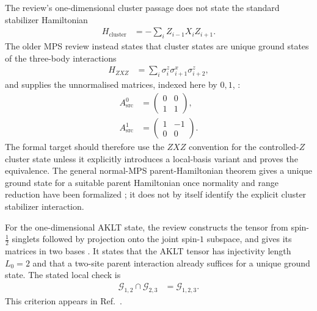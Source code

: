 \documentclass{article}
\begin{document}
The review's one-dimensional cluster passage does not state the standard
stabilizer Hamiltonian
\begin{align}
    H_{\mathrm{cluster}}
        &=
        -\sum_i Z_{i-1}X_iZ_{i+1}.
    \label{eq:rmp_example_parent_hamiltonian_scope_cluster_stabilizer}
\end{align}
The older MPS review instead states that cluster states are unique ground states
of the three-body interactions
\begin{align}
    H_{ZXZ}
        &=
        \sum_i
        \sigma_i^z
        \sigma_{i+1}^x
        \sigma_{i+2}^z,
    \label{eq:rmp_example_parent_hamiltonian_scope_cluster_three_body}
\end{align}
and supplies the unnormalised matrices, indexed here by $0,1$,
\cite[local TeX lines~374--387]{PerezGarcia2007MPSReps}:
\begin{align}
    A_{\mathrm{src}}^0 &= \begin{pmatrix}0&0\\1&1\end{pmatrix},
    \label{eq:rmp_example_parent_hamiltonian_scope_source_zero}\\
    A_{\mathrm{src}}^1 &= \begin{pmatrix}1&-1\\0&0\end{pmatrix}.
    \label{eq:rmp_example_parent_hamiltonian_scope_source_one}
\end{align}
The formal target
should therefore use the $ZXZ$ convention for the controlled-$Z$ cluster state
unless it explicitly introduces a local-basis variant and proves the
equivalence. The general normal-MPS parent-Hamiltonian theorem gives a unique
ground state for a suitable parent Hamiltonian once normality and range
reduction have been formalized
\cite[lines~2087--2090]{Cirac2021Matrix}; it does not by itself identify the
explicit cluster stabilizer interaction.

For the one-dimensional AKLT state, the review constructs the tensor from
spin-$\tfrac12$ singlets followed by projection onto the joint spin-$1$
subspace, and gives its matrices in two bases
\cite[lines~2372--2393]{Cirac2021Matrix}. It states that the AKLT tensor has
injectivity length $L_0=2$ and that a two-site parent interaction already
suffices for a unique ground state. The stated local check is
\begin{align}
    \mathcal G_{1,2}\cap\mathcal G_{2,3}
        &=
        \mathcal G_{1,2,3}.
    \label{eq:rmp_example_parent_hamiltonian_scope_aklt_intersection}
\end{align}
This criterion appears in Ref.~\cite[line~2095]{Cirac2021Matrix}.
\end{document}
